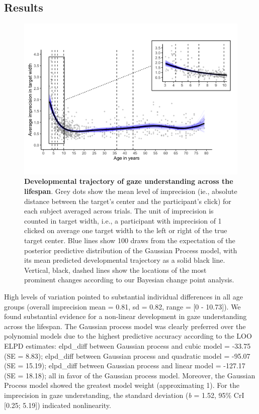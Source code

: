 \documentclass[
  man,mask,floatsintext]{apa7}
\begin{document}
\hypertarget{results}{%
\subsection{Results}\label{results}}



\begin{figure}

{\centering \includegraphics[width=1\linewidth]{../figures/lifespan_plot} 

}

\caption{\textbf{Developmental trajectory of gaze understanding across the lifespan}. Grey dots show the mean level of imprecision (ie., absolute distance between the target's center and the participant's click) for each subject averaged across trials. The unit of imprecision is counted in target width, i.e., a participant with imprecision of 1 clicked on average one target width to the left or right of the true target center. Blue lines show 100 draws from the expectation of the posterior predictive distribution of the Gaussian Process model, with its mean predicted developmental trajectory as a solid black line. Vertical, black, dashed lines show the locations of the most prominent changes according to our Bayesian change point analysis.}\label{fig:fig1}
\end{figure}

High levels of variation pointed to substantial individual differences in all age groups (overall imprecision mean = 0.81, sd = 0.82, range = {[}0 - 10.73{]}). We found substantial evidence for a non-linear development in gaze understanding across the lifespan. The Gaussian process model was clearly preferred over the polynomial models due to the highest predictive accuracy according to the LOO ELPD estimates: elpd\_diff between Gaussian process and cubic model = -33.75 (SE = 8.83); elpd\_diff between Gaussian process and quadratic model = -95.07 (SE = 15.19); elpd\_diff between Gaussian process and linear model = -127.17 (SE = 18.18); all in favor of the Gaussian process model. Moreover, the Gaussian Process model showed the greatest model weight (approximating 1). For the imprecision in gaze understanding, the standard deviation (\emph{b} = 1.52, 95\% CrI {[}0.25; 5.19{]}) indicated nonlinearity.
\end{document}

